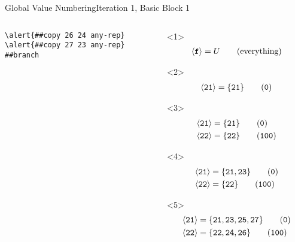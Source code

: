 \documentclass{beamer}
\newcommand{\vn}[1]{\ensuremath{\langle\texttt{#1}\rangle}}
\newcommand{\vreg}[1]{\texttt{#1}}
\begin{document}
\begin{frame}[fragile]{Global Value Numbering}{Iteration 1, Basic Block 1}
\begin{columns}[t,onlytextwidth]
\begin{column}[t]{.5\textwidth}
\begin{onlyenv}
\begin{Verbatim}[frame=single,commandchars=\\\{\}]
\alert{##copy 26 24 any-rep}
\alert{##copy 27 23 any-rep}
##branch
        \end{Verbatim}
      \end{onlyenv}
    \end{column}
    \begin{column}{.5\textwidth}
      \begin{onlyenv}<1>
        \begin{align*}
          \vn{\textbf{f}} &= U \tag{everything} \\
        \end{align*}
      \end{onlyenv}
      \begin{onlyenv}<2>
        \begin{align*}
          \vn{21} &= \{\vreg{21}\} \tag{\texttt{0}} \\
        \end{align*}
      \end{onlyenv}
      \begin{onlyenv}<3>
        \begin{align*}
          \vn{21} &= \{\vreg{21}\} \tag{\texttt{0}}   \\
          \vn{22} &= \{\vreg{22}\} \tag{\texttt{100}} \\
        \end{align*}
      \end{onlyenv}
      \begin{onlyenv}<4>
        \begin{align*}
          \vn{21} &= \{\vreg{21},\vreg{23}\} \tag{\texttt{0}}   \\
          \vn{22} &= \{\vreg{22}\}           \tag{\texttt{100}} \\
        \end{align*}
      \end{onlyenv}
      \begin{onlyenv}<5>
        \begin{align*}
          \vn{21} &= \{\vreg{21}, \vreg{23}, \vreg{25}, \vreg{27}\} \tag{\texttt{0}}   \\
          \vn{22} &= \{\vreg{22}, \vreg{24}, \vreg{26}\}            \tag{\texttt{100}} \\
        \end{align*}
      \end{onlyenv}
    \end{column}
  \end{columns}
\end{frame}
\end{document}
